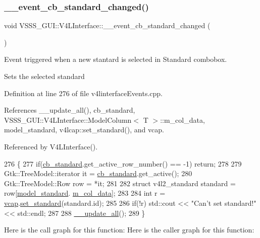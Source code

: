 \subsubsection{\texorpdfstring{\+\_\+\+\_\+event\+\_\+cb\+\_\+standard\+\_\+changed()}{\_\_event\_cb\_standard\_changed()}}
{\footnotesize\ttfamily void V\+S\+S\+S\+\_\+\+G\+U\+I\+::\+V4\+L\+Interface\+::\+\_\+\+\_\+event\+\_\+cb\+\_\+standard\+\_\+changed (\begin{DoxyParamCaption}{ }\end{DoxyParamCaption})}



Event triggered when a new stantard is selected in Standard combobox. 

Sets the selected standard 

Definition at line 276 of file v4linterface\+Events.\+cpp.



References \+\_\+\+\_\+update\+\_\+all(), cb\+\_\+standard, V\+S\+S\+S\+\_\+\+G\+U\+I\+::\+V4\+L\+Interface\+::\+Model\+Column$<$ T $>$\+::m\+\_\+col\+\_\+data, model\+\_\+standard, v4lcap\+::set\+\_\+standard(), and vcap.



Referenced by V4\+L\+Interface().


\begin{DoxyCode}
276                                                    \{
277         \textcolor{keywordflow}{if}(\hyperlink{class_v_s_s_s___g_u_i_1_1_v4_l_interface_ae78aa74f420bbb92b59ff0e0f0ac3b1e}{cb\_standard}.get\_active\_row\_number() == -1) \textcolor{keywordflow}{return};
278 
279         Gtk::TreeModel::iterator it = \hyperlink{class_v_s_s_s___g_u_i_1_1_v4_l_interface_ae78aa74f420bbb92b59ff0e0f0ac3b1e}{cb\_standard}.get\_active();
280         Gtk::TreeModel::Row row = *it;
281 
282         \textcolor{keyword}{struct }v4l2\_standard standard = row[\hyperlink{class_v_s_s_s___g_u_i_1_1_v4_l_interface_a369b8c6176f510330e83f567b4aa4887}{model\_standard}.
      \hyperlink{class_v_s_s_s___g_u_i_1_1_v4_l_interface_1_1_model_column_aa6720e1b3e47adb85d36c3ec3a2bb262}{m\_col\_data}];
283 
284         \textcolor{keywordtype}{int} r = \hyperlink{class_v_s_s_s___g_u_i_1_1_v4_l_interface_a7ece61f4ccc6d5321c445e60f34e7f33}{vcap}.\hyperlink{classv4lcap_a5ce097aed8f4d0aee209e0c78924812d}{set\_standard}(standard.id);
285 
286         \textcolor{keywordflow}{if}(!r) std::cout << \textcolor{stringliteral}{"Can't set standard!"} << std::endl;
287 
288         \hyperlink{class_v_s_s_s___g_u_i_1_1_v4_l_interface_ac3fe0a20fd30c6e9505eb375ef63e52e}{\_\_update\_all}();
289     \}
\end{DoxyCode}
Here is the call graph for this function\+:
Here is the caller graph for this function\+:
\mbox{\label{class_v_s_s_s___g_u_i_1_1_v4_l_interface_ab0ec02e9be4c0642bd05cb227ec7c8b8}} 
